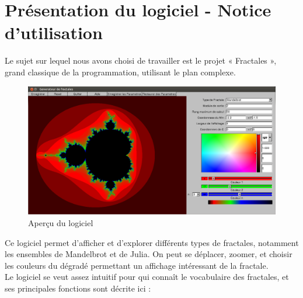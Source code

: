 \documentclass[a4paper,11pt]{article} \usepackage[T1]{fontenc} \usepackage[utf8]{inputenc} \usepackage[francais]{babel}
\begin{document}
  \tableofcontents          %
\vspace{3cm}

\section{Présentation du logiciel - Notice d'utilisation}
Le sujet  sur lequel nous avons choisi de travailler est le projet « Fractales », grand classique de la programmation, utilisant le plan complexe.
\begin{figure}[H] \begin{center} \includegraphics[width=\textwidth]{Images/InterfaceTotale.png}
    \caption{Aperçu du logiciel}
\end{center} \end{figure}

Ce logiciel permet d'afficher et d'explorer différents types de fractales, notamment les ensembles de Mandelbrot et de Julia. On peut se déplacer, zoomer, et choisir les couleurs du dégradé permettant un affichage intéressant de la fractale.\\

Le logiciel se veut assez intuitif pour qui connaît le vocabulaire des fractales, et ses  principales fonctions sont décrite ici :\\
\end{document}
